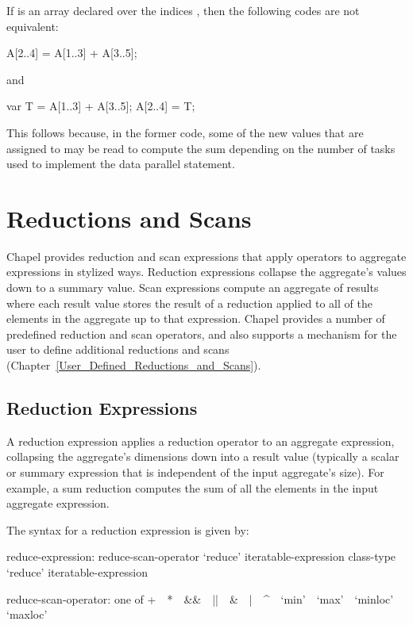 %
%
\begin{example}
If  is an array declared over the indices , then
the following codes are not equivalent:
\begin{chapel}
A[2..4] = A[1..3] + A[3..5];
\end{chapel}
and
\begin{chapel}
var T = A[1..3] + A[3..5];
A[2..4] = T;
\end{chapel}
This follows because, in the former code, some of the new values that
are assigned to  may be read to compute the sum depending on
the number of tasks used to implement the data parallel statement.
\end{example}



\section{Reductions and Scans}
\label{Reductions_and_Scans}

Chapel provides reduction and scan expressions that apply operators to
aggregate expressions in stylized ways.  Reduction expressions
collapse the aggregate's values down to a summary value.  Scan
expressions compute an aggregate of results where each result value
stores the result of a reduction applied to all of the elements in the
aggregate up to that expression.  Chapel provides a number of predefined
reduction and scan operators, and also supports a mechanism for the
user to define additional reductions and
scans (Chapter~\ref{User_Defined_Reductions_and_Scans}).

\subsection{Reduction Expressions}
\label{reduce}

A reduction expression applies a reduction operator to an aggregate
expression, collapsing the aggregate's dimensions down into a result
value (typically a scalar or summary expression that is independent of
the input aggregate's size).  For example, a sum reduction computes
the sum of all the elements in the input aggregate expression.

The syntax for a reduction expression is given by:
\begin{syntax}
reduce-expression:
  reduce-scan-operator `reduce' iteratable-expression
  class-type `reduce' iteratable-expression

reduce-scan-operator: one of
  + $ $ $ $ * $ $ $ $ && $ $ $ $ || $ $ $ $ & $ $ $ $ | $ $ $ $ ^ $ $ $ $ `min' $ $ $ $ `max' $ $ $ $ `minloc' $ $ $ $ `maxloc'
\end{syntax}

